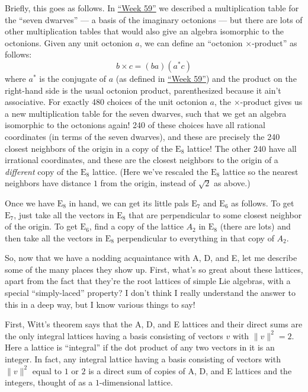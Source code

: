 \documentclass{article}
\begin{document}
Briefly, this goes as follows. In \protect\hyperlink{week59}{``Week
59''} we described a multiplication table for the ``seven dwarves'' ---
a basis of the imaginary octonions --- but there are lots of other
multiplication tables that would also give an algebra isomorphic to the
octonions. Given any unit octonion \(a\), we can define an ``octonion
\(\times\)-product'' as follows: \[b \times c = (b a)(a^* c)\] where
\(a^*\) is the conjugate of \(a\) (as defined in
\protect\hyperlink{week59}{``Week 59''}) and the product on the
right-hand side is the usual octonion product, parenthesized because it
ain't associative. For exactly 480 choices of the unit octonion \(a\),
the \(\times\)-product gives us a new multiplication table for the seven
dwarves, such that we get an algebra isomorphic to the octonions again!
240 of these choices have all rational coordinates (in terms of the
seven dwarves), and these are precisely the 240 closest neighbors of the
origin in a copy of the \(\mathrm{E}_8\) lattice! The other 240 have all
irrational coordinates, and these are the closest neighbors to the
origin of a \emph{different} copy of the \(\mathrm{E}_8\) lattice. (Here
we've rescaled the \(\mathrm{E}_8\) lattice so the nearest neighbors
have distance \(1\) from the origin, instead of \(\sqrt{2}\) as above.)

Once we have \(\mathrm{E}_8\) in hand, we can get its little pals
\(\mathrm{E}_7\) and \(\mathrm{E}_6\) as follows. To get
\(\mathrm{E}_7\), just take all the vectors in \(\mathrm{E}_8\) that are
perpendicular to some closest neighbor of the origin. To get
\(\mathrm{E}_6\), find a copy of the lattice \(A_2\) in \(\mathrm{E}_8\)
(there are lots) and then take all the vectors in \(\mathrm{E}_8\)
perpendicular to everything in that copy of \(A_2\).

So, now that we have a nodding acquaintance with A, D, and E, let me
describe some of the many places they show up. First, what's so great
about these lattices, apart from the fact that they're the root lattices
of simple Lie algebras, with a special ``simply-laced'' property? I
don't think I really understand the answer to this in a deep way, but I
know various things to say!

First, Witt's theorem says that the A, D, and E lattices and their
direct sums are the only integral lattices having a basis consisting of
vectors \(v\) with \(\|v\|^2 = 2\). Here a lattice is ``integral'' if
the dot product of any two vectors in it is an integer. In fact, any
integral lattice having a basis consisting of vectors with \(\|v\|^2\)
equal to \(1\) or \(2\) is a direct sum of copies of A, D, and E
lattices and the integers, thought of as a \(1\)-dimensional lattice.
\end{document}
